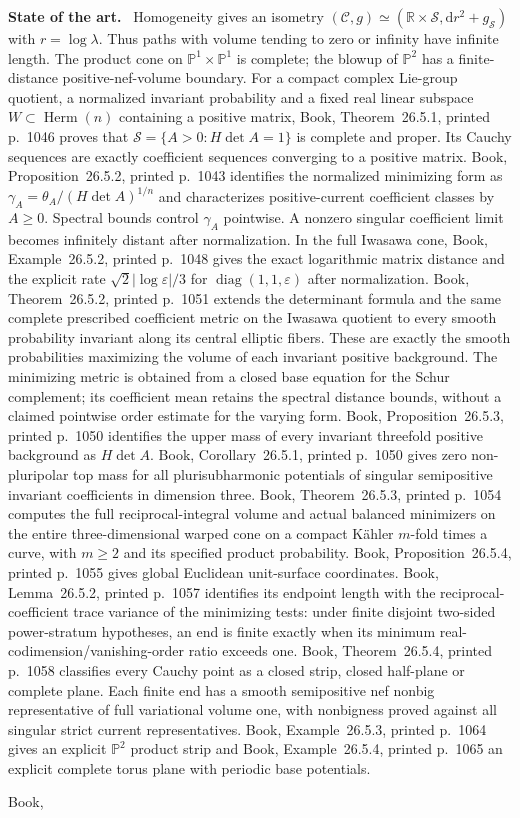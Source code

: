 \documentclass[11pt]{article}
\newcommand{\field}[1]{\par\medskip\noindent\textbf{#1.}\ }
\begin{document}
\field{State of the art} Homogeneity gives an isometry $(\mathscr C,g)\simeq(\mathbb R\times\mathscr S,\mathrm dr^2+g_{\mathscr S})$ with $r=\log\lambda$. Thus paths with volume tending to zero or infinity have infinite length. The product cone on $\mathbb P^1\times\mathbb P^1$ is complete; the blowup of $\mathbb P^2$ has a finite-distance positive-nef-volume boundary. For a compact complex Lie-group quotient, a normalized invariant probability and a fixed real linear subspace $W\subset\operatorname{Herm}(n)$ containing a positive matrix, Book, Theorem~26.5.1, printed p.~1046 proves that $\mathscr S=\{A>0:H\det A=1\}$ is complete and proper. Its Cauchy sequences are exactly coefficient sequences converging to a positive matrix. Book, Proposition~26.5.2, printed p.~1043 identifies the normalized minimizing form as $\gamma_A=\theta_A/(H\det A)^{1/n}$ and characterizes positive-current coefficient classes by $A\geq0$. Spectral bounds control $\gamma_A$ pointwise. A nonzero singular coefficient limit becomes infinitely distant after normalization. In the full Iwasawa cone, Book, Example~26.5.2, printed p.~1048 gives the exact logarithmic matrix distance and the explicit rate $\sqrt2|\log\varepsilon|/3$ for $\operatorname{diag}(1,1,\varepsilon)$ after normalization. Book, Theorem~26.5.2, printed p.~1051 extends the determinant formula and the same complete prescribed coefficient metric on the Iwasawa quotient to every smooth probability invariant along its central elliptic fibers. These are exactly the smooth probabilities maximizing the volume of each invariant positive background. The minimizing metric is obtained from a closed base equation for the Schur complement; its coefficient mean retains the spectral distance bounds, without a claimed pointwise order estimate for the varying form. Book, Proposition~26.5.3, printed p.~1050 identifies the upper mass of every invariant threefold positive background as $H\det A$. Book, Corollary~26.5.1, printed p.~1050 gives zero non-pluripolar top mass for all plurisubharmonic potentials of singular semipositive invariant coefficients in dimension three. Book, Theorem~26.5.3, printed p.~1054 computes the full reciprocal-integral volume and actual balanced minimizers on the entire three-dimensional warped cone on a compact K\"ahler $m$-fold times a curve, with $m\geq2$ and its specified product probability. Book, Proposition~26.5.4, printed p.~1055 gives global Euclidean unit-surface coordinates. Book, Lemma~26.5.2, printed p.~1057 identifies its endpoint length with the reciprocal-coefficient trace variance of the minimizing tests: under finite disjoint two-sided power-stratum hypotheses, an end is finite exactly when its minimum real-codimension/vanishing-order ratio exceeds one. Book, Theorem~26.5.4, printed p.~1058 classifies every Cauchy point as a closed strip, closed half-plane or complete plane. Each finite end has a smooth semipositive nef nonbig representative of full variational volume one, with nonbigness proved against all singular strict current representatives. Book, Example~26.5.3, printed p.~1064 gives an explicit $\mathbb P^2$ product strip and Book, Example~26.5.4, printed p.~1065 an explicit complete torus plane with periodic base potentials. \par Book, 
\end{document}
